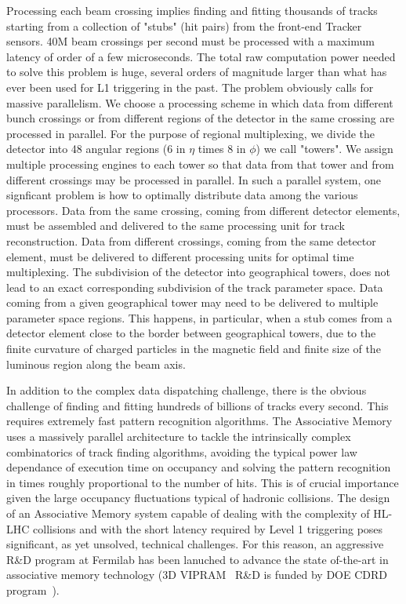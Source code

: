 	Processing each beam crossing implies finding and fitting thousands of tracks starting from a collection of "stubs" (hit pairs) from the front-end Tracker sensors. 40M beam crossings per second must be processed  with a maximum latency of order of a few microseconds. The total raw computation power needed to solve this problem is huge, several orders of magnitude larger than what has ever been used for L1 triggering in the past. The problem obviously calls for massive parallelism. We choose a processing scheme in which data from different bunch crossings or from different regions of the detector in the same crossing are processed in parallel.  For the purpose of regional multiplexing, we divide the detector into 48 angular regions (6 in $\eta$ times 8 in $\phi$) we call "towers". We assign multiple processing engines to each tower so that data from that  tower and from different crossings may be processed in parallel. 
In such a parallel system, one signficant problem is how to optimally distribute data among the various processors. Data from the same crossing, coming from different detector elements, must be assembled and delivered to the same processing unit for track reconstruction. Data from different crossings, coming from the same detector element, must be delivered to different processing units for optimal time multiplexing. The subdivision of the detector into geographical towers, does not lead to an exact corresponding subdivision of the track parameter space. Data coming from a given geographical tower may need to be delivered to multiple parameter space regions. This happens, in particular, when a stub comes from a detector element close to the border between geographical towers, due to the finite curvature of charged particles in the magnetic field and finite size of the luminous region along the beam axis. 

	In addition to the complex data dispatching challenge, there is the obvious challenge of finding and fitting hundreds of billions of tracks every second. This requires extremely fast pattern recognition algorithms. The Associative Memory~\cite{bib:Rist-89} uses a massively parallel architecture to tackle the intrinsically complex combinatorics of track finding algorithms, avoiding the typical power law dependance of execution time on occupancy and solving the pattern recognition in times roughly proportional to the number of hits. This is of crucial importance given the large occupancy fluctuations typical of hadronic collisions. 
The design of an Associative Memory system capable of dealing with the complexity of HL-LHC collisions and with the short latency required by Level 1 triggering poses significant, as yet unsolved, technical challenges.
For this reason, an aggressive R\&D program at Fermilab has been lanuched to advance the state of-the-art in associative memory technology  (3D VIPRAM~\cite{bib:VIP-11} R\&D is funded by DOE CDRD program~\cite{bib:VIP-12}).

